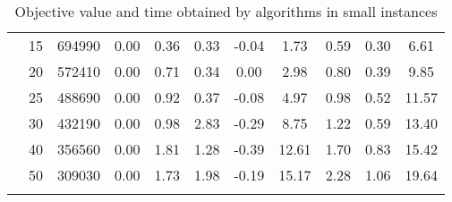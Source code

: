 {\begin{longtable}{@{}lclcccccccc@{}}
                      & 15 & 694990          & 0.00    & 0.36  & 0.33  & -0.04 & 1.73    & 0.59 & 0.30 & 6.61  \\
                      & 20 & 572410          & 0.00    & 0.71  & 0.34  & 0.00  & 2.98    & 0.80 & 0.39 & 9.85  \\
                      & 25 & 488690          & 0.00    & 0.92  & 0.37  & -0.08 & 4.97    & 0.98 & 0.52 & 11.57 \\
                      & 30 & 432190          & 0.00    & 0.98  & 2.83  & -0.29 & 8.75    & 1.22 & 0.59 & 13.40 \\
                      & 40 & 356560          & 0.00    & 1.81  & 1.28  & -0.39 & 12.61   & 1.70 & 0.83 & 15.42 \\
                      & 50 & 309030          & 0.00    & 1.73  & 1.98  & -0.19 & 15.17   & 2.28 & 1.06 & 19.64 \\ \bottomrule
\caption{Objective value and time obtained by algorithms in small instances}
\end{longtable}}
\label{results-all-A}